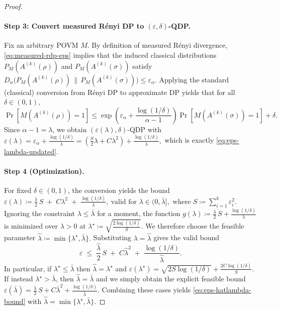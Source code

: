 \documentclass[10pt,a4paper]{amsart}
\begin{document}
\begin{proof}
\paragraph{Step 3: Convert measured R\'enyi DP to $(\varepsilon,\delta)$-QDP.}
Fix an arbitrary POVM $M$. By definition of measured R\'enyi divergence,
\eqref{eq:measured-rdp-eps} implies that the induced classical distributions
$P_M(A^{(k)}(\rho))$ and $P_M(A^{(k)}(\sigma))$ satisfy
$
D_{\alpha}\!\big(P_M(A^{(k)}(\rho))\,\|\,P_M(A^{(k)}(\sigma))\big)
\le
\varepsilon_\alpha.
$
Applying the standard (classical) conversion from R\'enyi DP to approximate DP yields that for all
$\delta\in(0,1)$,
\[
\Pr[M(A^{(k)}(\rho))=1]
\le
\exp\!\left(\varepsilon_\alpha+\frac{\log(1/\delta)}{\alpha-1}\right)
\Pr[M(A^{(k)}(\sigma))=1]+\delta.
\]
Since $\alpha-1=\lambda$, we obtain $(\varepsilon(\lambda),\delta)$-QDP with
$
\varepsilon(\lambda)
=
\varepsilon_\alpha + \frac{\log(1/\delta)}{\lambda}
=
\left(\frac{S}{2}\lambda + C\lambda^2\right) + \frac{\log(1/\delta)}{\lambda},
$
which is exactly \eqref{eq:eps-lambda-updated}.


\paragraph{Step 4 (Optimization).}
For fixed $\delta\in(0,1)$, the conversion 
yields the bound
$
\varepsilon(\lambda)
\coloneqq \frac{\lambda}{2}\,S \;+\; C\lambda^2 \;+\; \frac{\log(1/\delta)}{\lambda},
\ \text{valid for } \lambda\in(0,\bar\lambda],
$
where $S\coloneqq\sum_{i=1}^k \varepsilon_i^2$.
Ignoring the constraint $\lambda\le \bar\lambda$ for a moment, the function
$
g(\lambda)\coloneqq\frac{\lambda}{2}\,S+\frac{\log(1/\delta)}{\lambda}
$
is minimized over $\lambda>0$ at
$
\lambda^\star \coloneqq \sqrt{\frac{2\log(1/\delta)}{S}}.
$
We therefore choose the feasible parameter
$
\hat\lambda \coloneqq \min\{\lambda^\star,\bar\lambda\}.
$
Substituting $\lambda=\hat\lambda$ gives the valid bound
\begin{equation}
\label{eq:eps-hatlambda-bound}
\varepsilon
\;\le\;
\frac{\hat\lambda}{2}\,S \;+\; C\hat\lambda^2 \;+\; \frac{\log(1/\delta)}{\hat\lambda}.
\end{equation}
In particular, if $\lambda^\star\le \bar\lambda$ then $\hat\lambda=\lambda^\star$ and
$
\varepsilon(\lambda^\star)
=
\sqrt{2S\log(1/\delta)}+\frac{2C\log(1/\delta)}{S}.
$
If instead $\lambda^\star>\bar\lambda$, then $\hat\lambda=\bar\lambda$ and we simply obtain the explicit feasible bound \\ 
$
\varepsilon(\bar\lambda)
=
\frac{\bar\lambda}{2}\,S + C\bar\lambda^2 + \frac{\log(1/\delta)}{\bar\lambda}.$
Combining these cases yields \eqref{eq:eps-hatlambda-bound} with
$\hat\lambda=\min\{\lambda^\star,\bar\lambda\}$.

\end{proof}
\end{document}
